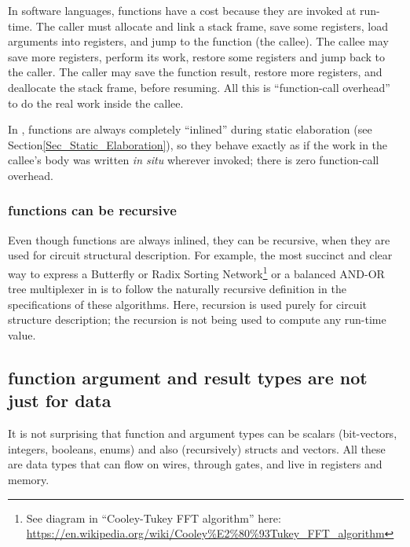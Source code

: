 In software languages, functions have a cost because they are invoked
at run-time.  The caller must allocate and link a stack frame, save
some registers, load arguments into registers, and jump to the
function (the callee).  The callee may save more registers, perform
its work, restore some registers and jump back to the caller.  The
caller may save the function result, restore more registers, and
deallocate the stack frame, before resuming.  All this is
``function-call overhead'' to do the real work inside the callee.

In {\BSV}, functions are always completely ``inlined'' during static
elaboration (see Section\ref{Sec_Static_Elaboration}), so they behave
exactly as if the work in the callee's body was written \emph{in situ}
wherever invoked; there is zero function-call overhead.


\subsubsection{{\BSV} functions can be recursive}


Even though {\BSV} functions are always inlined, they can be
recursive, when they are used for circuit structural description.  For
example, the most succinct and clear way to express a Butterfly or
Radix Sorting Network\footnote{See diagram in ``Cooley-Tukey FFT
algorithm'' here:
\url{https://en.wikipedia.org/wiki/Cooley\%E2\%80\%93Tukey_FFT_algorithm}}
or a balanced AND-OR tree multiplexer in {\BSV} is to follow the
naturally recursive definition in the specifications of these
algorithms.  Here, recursion is used purely for circuit structure
description; the recursion is not being used to compute any run-time
value.


\subsection{{\BSV} function argument and result types are not just for data}


It is not surprising that {\BSV} function and argument types can be
scalars (bit-vectors, integers, booleans, enums) and also
(recursively) structs and vectors.  All these are data types that can
flow on wires, through gates, and live in registers and memory.

